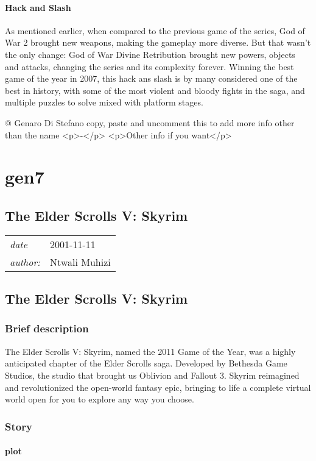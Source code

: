 \documentclass[a4paper,10pt]{book}
\newcommand{\pageHeader}[4]{
    \section{#1}
    \vspace{-0.3cm}
    \begin{table}[h!]
     \begin{tabular}{ll}
        \hline
        \textit{date} & #2 \\
        \textit{author: } & #3\\
        \hline
     \end{tabular}
    \end{table}
    \vspace{-0.3cm}
}
\begin{document}
 \subsubsection{Hack and Slash }
 
       As mentioned earlier, when compared to the previous game of the series, God of War 2 brought new weapons, making the gameplay more diverse. But that wasn't the only change: God of War Divine Retribution brought new powers, objects and attacks, changing the series and its complexity forever. Winning the best game of the year in 2007, this hack ans slash is by many considered one of the best in history, with some of the most violent and bloody fights in the saga, and multiple puzzles to solve mixed with platform stages.
           
 
 
 
 
 @ Genaro Di Stefano 
  copy, paste and uncomment this to add more info other than the name
              <p>-</p>
              <p>Other info if you want</p>
             
 
 \newpage\chapter{gen7}\newpage\pageHeader{The Elder Scrolls V: Skyrim}{2001-11-11}{Ntwali Muhizi}{The elder scrolls v page: one of the pioneers of RPGS}
 \section{The Elder Scrolls V: Skyrim }
 \subsection{Brief description }
 
          The Elder Scrolls V: Skyrim, named the 2011 Game of the Year, was a highly anticipated chapter of the Elder Scrolls saga. Developed by Bethesda Game Studios,
          the studio that brought us Oblivion and Fallout 3. Skyrim reimagined and revolutionized the open-world
          fantasy epic, bringing to life a complete virtual world open for you to explore any way you choose.
         
 \subsection{ Story }
 
 \subsubsection{plot }
 
\end{document}
